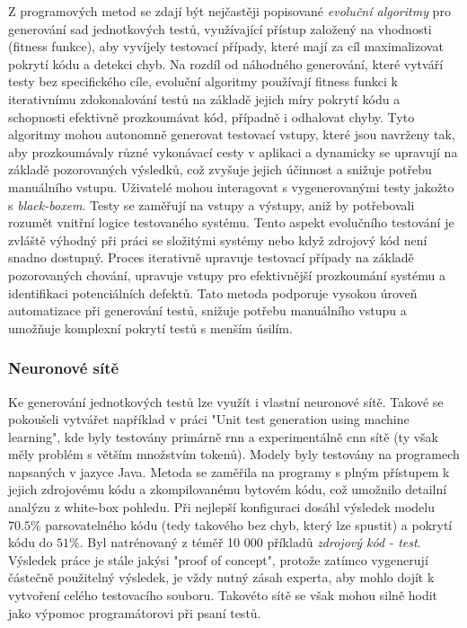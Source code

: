 \documentclass[czech, ma, kiv, he, iso690numb, pdf, viewonly]{fasthesis}
\begin{document}
        Z programových metod se zdají být nejčastěji popisované \emph{evoluční algoritmy} pro generování sad jednotkových testů, využívající přístup založený na vhodnosti (fitness funkce), aby vyvíjely testovací případy, které mají za cíl maximalizovat pokrytí kódu a detekci chyb. Na rozdíl od náhodného generování, které vytváří testy bez specifického cíle, evoluční algoritmy používají fitness funkci k iterativnímu zdokonalování testů na základě jejich míry pokrytí kódu a schopnosti efektivně prozkoumávat kód, případně i odhalovat chyby. Tyto algoritmy mohou autonomně generovat testovací vstupy, které jsou navrženy tak, aby prozkoumávaly různé vykonávací cesty v aplikaci a dynamicky se upravují na základě pozorovaných výsledků, což zvyšuje jejich účinnost a snižuje potřebu manuálního vstupu. Uživatelé mohou interagovat s vygenerovanými testy jakožto s \textit{black-boxem}. Testy se zaměřují na vstupy a výstupy, aniž by potřebovali rozumět vnitřní logice testovaného systému. Tento aspekt evolučního testování je zvláště výhodný při práci se složitými systémy nebo když zdrojový kód není snadno dostupný. Proces iterativně upravuje testovací případy na základě pozorovaných chování, upravuje vstupy pro efektivnější prozkoumání systému a identifikaci potenciálních defektů. Tato metoda podporuje vysokou úroveň automatizace při generování testů, snižuje potřebu manuálního vstupu a umožňuje komplexní pokrytí testů s menším úsilím. \cite{CAMPOS2018207} \cite{abs-2111-05003}

        \subsubsection{Neuronové sítě}
        Ke generování jednotkových testů lze využít i vlastní neuronové sítě. Takové se pokoušeli vytvářet například v práci "Unit test generation using machine learning"\cite{Saes2018UnitTestGeneration}, kde byly testovány primárně \Acrshort{rnn} a experimentálně \Acrshort{cnn} sítě (ty však měly problém s větším množstvím tokenů). Modely byly testovány na programech napsaných v jazyce Java. Metoda se zaměřila na programy s plným přístupem k jejich zdrojovému kódu a zkompilovanému bytovém kódu, což umožnilo detailní analýzu z white-box pohledu. Při nejlepší konfiguraci dosáhl výsledek modelu \(70.5\%\) parsovatelného kódu (tedy takového bez chyb, který lze spustit) a pokrytí kódu do \(51\%\). Byl natrénovaný z téměř 10 000 příkladů \textit{zdrojový kód - test}. Výsledek práce je stále jakýsi "proof of concept", protože zatímco vygenerují částečně použitelný výsledek, je vždy nutný zásah experta, aby mohlo dojít k vytvoření celého testovacího souboru. Takovéto sítě se však mohou silně hodit jako výpomoc programátorovi při psaní testů.
\end{document}
